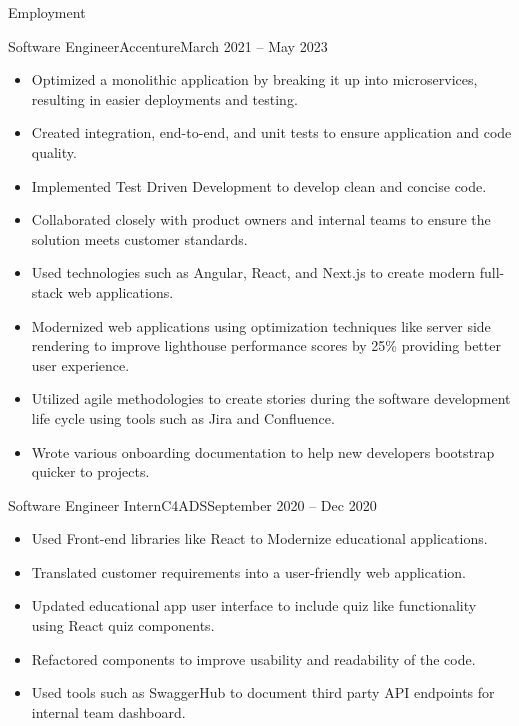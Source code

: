 \documentclass[]{mcdowellcv}
\begin{document}
\begin{cvsection}{Employment}
		\begin{cvsubsection}{Software Engineer}{Accenture}{March 2021 -- May 2023}	
			\begin{itemize}
				\item Optimized a monolithic application by breaking it up into microservices, resulting in easier deployments and testing.
				\item Created integration, end-to-end, and unit tests to ensure application and code quality.
				\item Implemented Test Driven Development to develop clean and concise code.
				\item Collaborated closely with product owners and internal teams to ensure the solution meets customer standards.
				\item Used technologies such as Angular, React, and Next.js to create modern full-stack web applications.
				\item Modernized web applications using optimization techniques like server side rendering to improve lighthouse performance scores by 25\% providing better user experience.
				\item Utilized agile methodologies to create stories during the software development life cycle using tools such as Jira and Confluence.
				\item Wrote various onboarding documentation to help new developers bootstrap quicker to projects.
			\end{itemize}
		\end{cvsubsection}
		
		\begin{cvsubsection}{Software Engineer Intern}{C4ADS}{September 2020 -- Dec 2020}		
			\begin{itemize}
				\item Used Front-end libraries like React to Modernize educational applications.
				\item Translated customer requirements into a user-friendly web application.
				\item Updated educational app user interface to include quiz like functionality using React quiz components.
				\item Refactored components to improve usability and readability of the code.
				\item Used tools such as SwaggerHub to document third party API endpoints for internal team dashboard.
			\end{itemize}
		\end{cvsubsection}
		

\end{cvsection}
\end{document}
